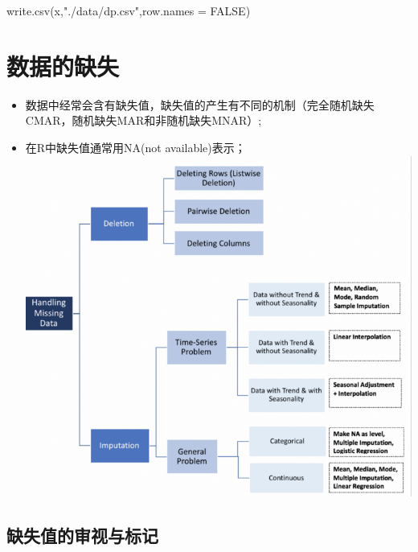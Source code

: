\documentclass[
]{book}
\newenvironment{Shaded}{\begin{snugshade}}{\end{snugshade}}
\newcommand{\AttributeTok}[1]{\textcolor[rgb]{0.77,0.63,0.00}{#1}}
\newcommand{\ConstantTok}[1]{\textcolor[rgb]{0.00,0.00,0.00}{#1}}
\newcommand{\FunctionTok}[1]{\textcolor[rgb]{0.00,0.00,0.00}{#1}}
\newcommand{\NormalTok}[1]{#1}
\newcommand{\StringTok}[1]{\textcolor[rgb]{0.31,0.60,0.02}{#1}}
\providecommand{\tightlist}{%
  \setlength{\itemsep}{0pt}\setlength{\parskip}{0pt}}
\begin{document}
\begin{Shaded}
\begin{Highlighting}[]
\FunctionTok{write.csv}\NormalTok{(x,}\StringTok{"./data/dp.csv"}\NormalTok{,}\AttributeTok{row.names =} \ConstantTok{FALSE}\NormalTok{)}
\end{Highlighting}
\end{Shaded}

\hypertarget{ux6570ux636eux7684ux7f3aux5931}{%
\section{数据的缺失}\label{ux6570ux636eux7684ux7f3aux5931}}

\begin{itemize}
\tightlist
\item
  数据中经常会含有缺失值，缺失值的产生有不同的机制（完全随机缺失CMAR，随机缺失MAR和非随机缺失MNAR）;
\item
  在R中缺失值通常用NA(not available)表示；
  \includegraphics{pics/missingdata.png}
\end{itemize}

\hypertarget{ux7f3aux5931ux503cux7684ux5ba1ux89c6ux4e0eux6807ux8bb0}{%
\subsection{缺失值的审视与标记}\label{ux7f3aux5931ux503cux7684ux5ba1ux89c6ux4e0eux6807ux8bb0}}
\end{document}
